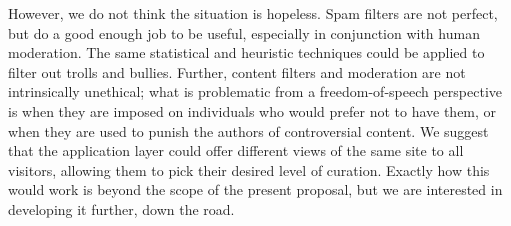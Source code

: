\documentclass[oneside,tinymargin]{zarticle}
\begin{document}
\begin{multicols}{2}
However, we do not think the situation is hopeless.  Spam filters are
not perfect, but do a good enough job to be useful, especially in
conjunction with human moderation.  The same statistical and heuristic
techniques could be applied to filter out trolls and bullies.
Further, content filters and moderation are not intrinsically
unethical; what is problematic from a freedom-of-speech perspective is
when they are imposed on individuals who would prefer not to have
them, or when they are used to punish the authors of controversial
content.  We suggest that the application layer could offer different
views of the same site to all visitors, allowing them to pick their
desired level of curation.  Exactly how this would work is beyond the
scope of the present proposal, but we are interested in developing it
further, down the road.

\printbibliography
\end{multicols}
\end{document}
